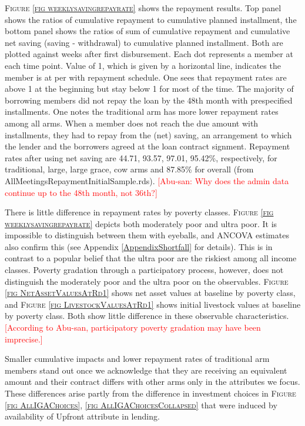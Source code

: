 	\textsc{\footnotesize Figure \ref{fig weeklysavingrepayrate}} shows the repayment results. Top panel shows the ratios of cumulative repayment to cumulative planned installment, the bottom panel shows the ratios of sum of cumulative repayment and cumulative net saving (saving - withdrawal) to cumulative planned installment. Both are plotted against weeks after first disbursement. Each dot represents a member at each time point. Value of 1, which is given by a horizontal line, indicates the member is at per with repayment schedule. One sees that repayment rates are above 1 at the beginning but stay below 1 for most of the time. The majority of borrowing members did not repay the loan by the 48th month with prespecified installments. One notes the \textsf{traditional} arm has more lower repayment rates among all arms. When a member does not reach the due amount with installments, they had to repay from the (net) saving, an arrangement to which the lender and the borrowers agreed at the loan contract signment. Repayment rates after using net saving are 44.71, 93.57, 97.01, 95.42\%, respectively, for \textsf{traditional, large, large grace, cow} arms and 87.85\% for overall (from \textsf{\footnotesize AllMeetingsRepaymentInitialSample.rds}). \textcolor{red}{[Abu-san: Why does the admin data continue up to the 48th month, not 36th?]}

	There is little difference in repayment rates by poverty classes. \textsc{\footnotesize Figure \ref{fig weeklysavingrepayrate}} depicts both moderately poor and ultra poor. It is impossible to distinguish between them with eyeballs, and ANCOVA estimates also confirm this (see Appendix \ref{AppendixShortfall} for details). This is in contrast to a popular belief that the ultra poor are the riskiest among all income classes. Poverty gradation through a participatory process, however, does not distinguish the moderately poor and the ultra poor on the observables. \textsc{\footnotesize Figure \ref{fig NetAssetValuesAtRd1}} shows net asset values at baseline by poverty class, and \textsc{\footnotesize Figure \ref{fig LivestockValuesAtRd1}} shows initial livestock values at baseline by poverty class. Both show little difference in these observable characteristics. \textcolor{red}{[According to Abu-san, participatory poverty gradation may have been imprecise.]}

	Smaller cumulative impacts and lower repayment rates of \textsf{traditional} arm members stand out once we acknowledge that they are receiving an equivalent amount and their contract differs with other arms only in the attributes we focus. These differences arise partly from the difference in investment choices in \textsc{\small Figure \ref{fig AllIGAChoices}, \ref{fig AllIGAChoicesCollapsed}} that were induced by availability of \textsf{Upfront} attribute in lending.
	
